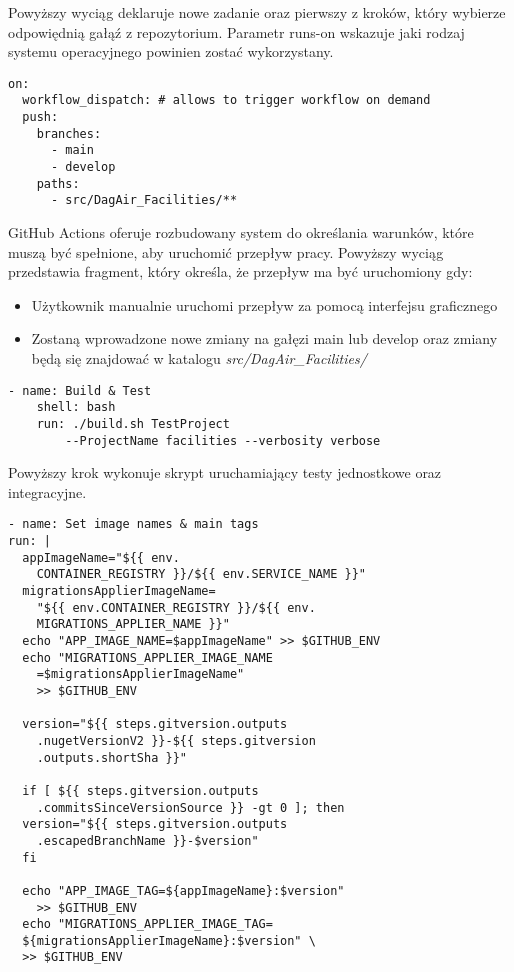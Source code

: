 Powyższy wyciąg deklaruje nowe zadanie oraz pierwszy z kroków, który wybierze 
odpowiędnią gałąź z repozytorium. Parametr runs-on wskazuje jaki rodzaj systemu 
operacyjnego powinien zostać wykorzystany.

\begin{lstlisting}
on:
  workflow_dispatch: # allows to trigger workflow on demand
  push:
    branches: 
      - main
      - develop
    paths:
      - src/DagAir_Facilities/**
\end{lstlisting}

GitHub Actions oferuje rozbudowany system do określania warunków, które muszą być 
spełnione, aby uruchomić przepływ pracy. Powyższy wyciąg przedstawia fragment, który 
określa, że przepływ ma być uruchomiony gdy:

\begin{itemize} %
    \item Użytkownik manualnie uruchomi przepływ za pomocą interfejsu graficznego
    \item Zostaną wprowadzone nowe zmiany na gałęzi main lub develop oraz zmiany będą 
    się znajdować w katalogu \textit{src/DagAir\_Facilities/}
\end{itemize}

\begin{lstlisting}
- name: Build & Test
    shell: bash
    run: ./build.sh TestProject 
        --ProjectName facilities --verbosity verbose
\end{lstlisting}

Powyższy krok wykonuje skrypt uruchamiający testy jednostkowe oraz integracyjne.

\begin{lstlisting}
- name: Set image names & main tags
run: |
  appImageName="${{ env.
    CONTAINER_REGISTRY }}/${{ env.SERVICE_NAME }}"
  migrationsApplierImageName=
    "${{ env.CONTAINER_REGISTRY }}/${{ env.
    MIGRATIONS_APPLIER_NAME }}"
  echo "APP_IMAGE_NAME=$appImageName" >> $GITHUB_ENV
  echo "MIGRATIONS_APPLIER_IMAGE_NAME
    =$migrationsApplierImageName" 
    >> $GITHUB_ENV

  version="${{ steps.gitversion.outputs
    .nugetVersionV2 }}-${{ steps.gitversion
    .outputs.shortSha }}"

  if [ ${{ steps.gitversion.outputs
    .commitsSinceVersionSource }} -gt 0 ]; then
  version="${{ steps.gitversion.outputs
    .escapedBranchName }}-$version"
  fi

  echo "APP_IMAGE_TAG=${appImageName}:$version" 
    >> $GITHUB_ENV
  echo "MIGRATIONS_APPLIER_IMAGE_TAG=
  ${migrationsApplierImageName}:$version" \
  >> $GITHUB_ENV
\end{lstlisting}

